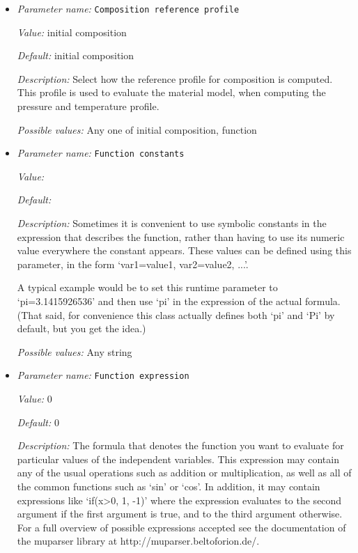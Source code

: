 \begin{itemize}
\item {\it Parameter name:} {\tt Composition reference profile}
\label{parameters:Adiabatic conditions model/Initial profile/Composition reference profile}


{\it Value:} initial composition


{\it Default:} initial composition


{\it Description:} Select how the reference profile for composition is computed. This profile is used to evaluate the material model, when computing the pressure and temperature profile.


{\it Possible values:} Any one of initial composition, function
\item {\it Parameter name:} {\tt Function constants}
\label{parameters:Adiabatic conditions model/Initial profile/Function constants}


{\it Value:} 


{\it Default:} 


{\it Description:} Sometimes it is convenient to use symbolic constants in the expression that describes the function, rather than having to use its numeric value everywhere the constant appears. These values can be defined using this parameter, in the form `var1=value1, var2=value2, ...'.

A typical example would be to set this runtime parameter to `pi=3.1415926536' and then use `pi' in the expression of the actual formula. (That said, for convenience this class actually defines both `pi' and `Pi' by default, but you get the idea.)


{\it Possible values:} Any string
\item {\it Parameter name:} {\tt Function expression}
\label{parameters:Adiabatic conditions model/Initial profile/Function expression}


{\it Value:} 0


{\it Default:} 0


{\it Description:} The formula that denotes the function you want to evaluate for particular values of the independent variables. This expression may contain any of the usual operations such as addition or multiplication, as well as all of the common functions such as `sin' or `cos'. In addition, it may contain expressions like `if(x>0, 1, -1)' where the expression evaluates to the second argument if the first argument is true, and to the third argument otherwise. For a full overview of possible expressions accepted see the documentation of the muparser library at http://muparser.beltoforion.de/.


\end{itemize}
